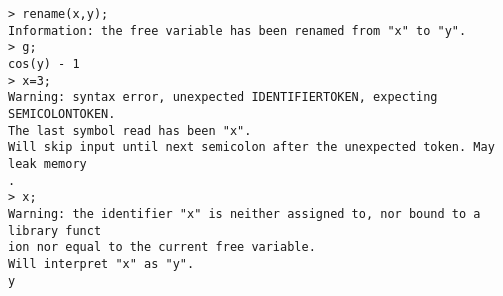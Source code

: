 \begin{center}\begin{minipage}{15cm}\begin{Verbatim}[frame=single]
> rename(x,y);
Information: the free variable has been renamed from "x" to "y".
> g;
cos(y) - 1
> x=3;
Warning: syntax error, unexpected IDENTIFIERTOKEN, expecting SEMICOLONTOKEN.
The last symbol read has been "x".
Will skip input until next semicolon after the unexpected token. May leak memory
.
> x;
Warning: the identifier "x" is neither assigned to, nor bound to a library funct
ion nor equal to the current free variable.
Will interpret "x" as "y".
y
\end{Verbatim}
\end{minipage}\end{center}
